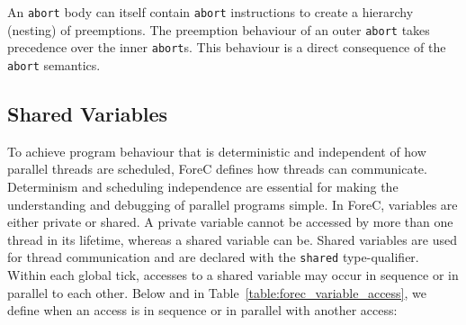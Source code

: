 

An \verb$abort$ body can itself contain \verb$abort$ instructions to 
create a hierarchy (nesting) of preemptions. The preemption
behaviour of an outer \verb$abort$ takes precedence over the inner 
\verb$abort$s. This behaviour is a direct consequence of the 
\verb$abort$ semantics.



\subsection{Shared Variables}
\label{sec:forec_shared_variables}
To achieve program behaviour that is deterministic and independent of how 
parallel threads are scheduled, ForeC defines how threads can communicate. 
Determinism and scheduling independence are essential for making the
understanding and debugging of parallel programs simple. In ForeC, 
variables are either private or shared. A private variable cannot 
be accessed by more than one thread in its lifetime, whereas 
a shared variable can be. Shared variables are used for thread 
communication and are declared with the \verb$shared$ type-qualifier. 
Within each global tick, accesses to a shared variable may occur in 
sequence or in parallel to each other. Below and in Table~\ref{table:forec_variable_access},
we define when an access is in sequence or in parallel with another
access:

